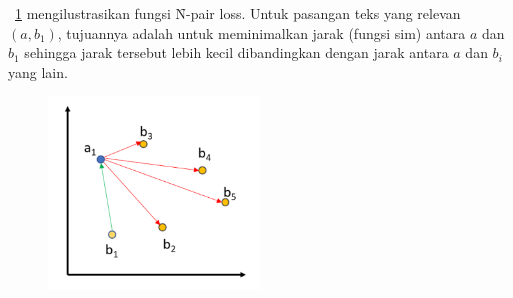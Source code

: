 \pic~\ref{fig:n-pair-loss} mengilustrasikan fungsi \f{N-pair loss}. Untuk pasangan teks yang relevan $(a, b_1)$, tujuannya adalah untuk meminimalkan jarak (fungsi sim) antara $a$ dan $b_1$ sehingga jarak tersebut lebih kecil dibandingkan dengan jarak antara $a$ dan $b_i$ yang lain.
\begin{figure}
    \centering
    \includegraphics[width=0.5\textwidth]{assets/pics/InfoNCE.png}
    \label{fig:n-pair-loss}
\end{figure}

















        

